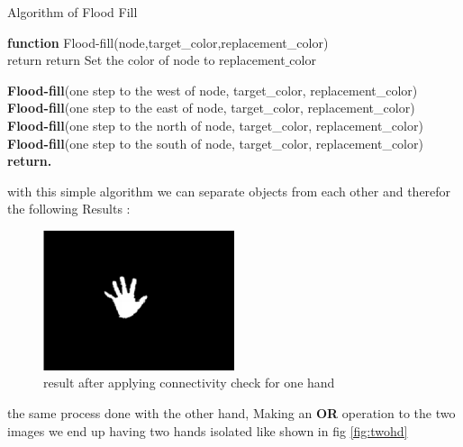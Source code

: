 \begin{algorithm}[H]

\caption{Algorithm of Flood Fill }
\textbf{function}  Flood-fill(node,target\_color,replacement\_color)\\ 
    {
     return
    }
    {
     return
    }
Set the color of node to replacement$\_$color 

\textbf{Flood-fill}(one step to the west of node, target\_color, replacement\_color)\\
\textbf{Flood-fill}(one step to the east of node, target\_color, replacement\_color)\\
\textbf{Flood-fill}(one step to the north of node, target\_color, replacement\_color)\\
\textbf{Flood-fill}(one step to the south of node, target\_color, replacement\_color)\\
\textbf{return.} 
\end{algorithm}
with this simple algorithm we can separate objects from each other and therefor the following  Results : 
 
\begin{figure}[H]
\centering
\includegraphics[width=0.5\textwidth]{img/finalresult.png}
\caption{result after applying connectivity check for one hand  }
\label{fig:cam11}
\end{figure}

the same process done with the other hand, Making an \textbf{OR } operation to the two images we end up having two hands isolated like shown in fig \ref{fig:twohd}

